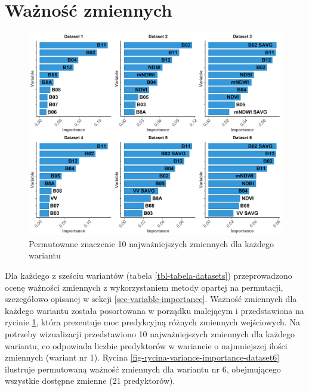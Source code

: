 \documentclass{amuthesis}
\begin{document}
\hypertarget{sec-results-variable-importance}{%
\section{Ważność zmiennych}\label{sec-results-variable-importance}}

\begin{figure}[t]

{\centering \includegraphics[width=1.05\textwidth,height=\textheight]{figures/importance_cowplot.png}

}

\caption{\label{fig-rycina-variance-importance_cowplot}Permutowane
znaczenie 10 najważniejszych zmiennych dla każdego wariantu}

\end{figure}

Dla każdego z sześciu wariantów (tabela \ref{tbl-tabela-datasets})
przeprowadzono ocenę ważności zmiennych z wykorzystaniem metody opartej
na permutacji, szczegółowo opisanej w sekcji
\ref{sec-variable-importance}. Ważność zmiennych dla każdego wariantu
została posortowana w porządku malejącym i przedstawiona na rycinie
\ref{fig-rycina-variance-importance_cowplot}, która prezentuje moc
predykcyjną różnych zmiennych wejściowych. Na potrzeby wizualizacji
przedstawiono 10 najważniejszych zmiennych dla każdego wariantu, co
odpowiada liczbie predyktorów w wariancie o najmniejszej ilości
zmiennych (wariant nr 1). Rycina
\ref{fig-rycina-variance-importance-dataset6} ilustruje permutowaną
ważność zmiennych dla wariantu nr 6, obejmującego wszystkie dostępne
zmienne (21 predyktorów).
\end{document}
